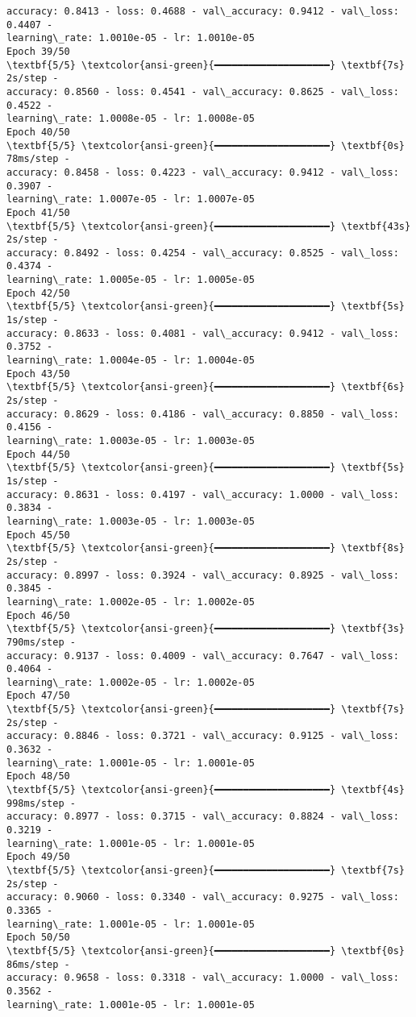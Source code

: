 \documentclass[11pt]{article}
\begin{document}
\begin{Verbatim}[commandchars=\\\{\}]
accuracy: 0.8413 - loss: 0.4688 - val\_accuracy: 0.9412 - val\_loss: 0.4407 -
learning\_rate: 1.0010e-05 - lr: 1.0010e-05
Epoch 39/50
\textbf{5/5} \textcolor{ansi-green}{━━━━━━━━━━━━━━━━━━━━} \textbf{7s} 2s/step -
accuracy: 0.8560 - loss: 0.4541 - val\_accuracy: 0.8625 - val\_loss: 0.4522 -
learning\_rate: 1.0008e-05 - lr: 1.0008e-05
Epoch 40/50
\textbf{5/5} \textcolor{ansi-green}{━━━━━━━━━━━━━━━━━━━━} \textbf{0s} 78ms/step -
accuracy: 0.8458 - loss: 0.4223 - val\_accuracy: 0.9412 - val\_loss: 0.3907 -
learning\_rate: 1.0007e-05 - lr: 1.0007e-05
Epoch 41/50
\textbf{5/5} \textcolor{ansi-green}{━━━━━━━━━━━━━━━━━━━━} \textbf{43s} 2s/step -
accuracy: 0.8492 - loss: 0.4254 - val\_accuracy: 0.8525 - val\_loss: 0.4374 -
learning\_rate: 1.0005e-05 - lr: 1.0005e-05
Epoch 42/50
\textbf{5/5} \textcolor{ansi-green}{━━━━━━━━━━━━━━━━━━━━} \textbf{5s} 1s/step -
accuracy: 0.8633 - loss: 0.4081 - val\_accuracy: 0.9412 - val\_loss: 0.3752 -
learning\_rate: 1.0004e-05 - lr: 1.0004e-05
Epoch 43/50
\textbf{5/5} \textcolor{ansi-green}{━━━━━━━━━━━━━━━━━━━━} \textbf{6s} 2s/step -
accuracy: 0.8629 - loss: 0.4186 - val\_accuracy: 0.8850 - val\_loss: 0.4156 -
learning\_rate: 1.0003e-05 - lr: 1.0003e-05
Epoch 44/50
\textbf{5/5} \textcolor{ansi-green}{━━━━━━━━━━━━━━━━━━━━} \textbf{5s} 1s/step -
accuracy: 0.8631 - loss: 0.4197 - val\_accuracy: 1.0000 - val\_loss: 0.3834 -
learning\_rate: 1.0003e-05 - lr: 1.0003e-05
Epoch 45/50
\textbf{5/5} \textcolor{ansi-green}{━━━━━━━━━━━━━━━━━━━━} \textbf{8s} 2s/step -
accuracy: 0.8997 - loss: 0.3924 - val\_accuracy: 0.8925 - val\_loss: 0.3845 -
learning\_rate: 1.0002e-05 - lr: 1.0002e-05
Epoch 46/50
\textbf{5/5} \textcolor{ansi-green}{━━━━━━━━━━━━━━━━━━━━} \textbf{3s} 790ms/step -
accuracy: 0.9137 - loss: 0.4009 - val\_accuracy: 0.7647 - val\_loss: 0.4064 -
learning\_rate: 1.0002e-05 - lr: 1.0002e-05
Epoch 47/50
\textbf{5/5} \textcolor{ansi-green}{━━━━━━━━━━━━━━━━━━━━} \textbf{7s} 2s/step -
accuracy: 0.8846 - loss: 0.3721 - val\_accuracy: 0.9125 - val\_loss: 0.3632 -
learning\_rate: 1.0001e-05 - lr: 1.0001e-05
Epoch 48/50
\textbf{5/5} \textcolor{ansi-green}{━━━━━━━━━━━━━━━━━━━━} \textbf{4s} 998ms/step -
accuracy: 0.8977 - loss: 0.3715 - val\_accuracy: 0.8824 - val\_loss: 0.3219 -
learning\_rate: 1.0001e-05 - lr: 1.0001e-05
Epoch 49/50
\textbf{5/5} \textcolor{ansi-green}{━━━━━━━━━━━━━━━━━━━━} \textbf{7s} 2s/step -
accuracy: 0.9060 - loss: 0.3340 - val\_accuracy: 0.9275 - val\_loss: 0.3365 -
learning\_rate: 1.0001e-05 - lr: 1.0001e-05
Epoch 50/50
\textbf{5/5} \textcolor{ansi-green}{━━━━━━━━━━━━━━━━━━━━} \textbf{0s} 86ms/step -
accuracy: 0.9658 - loss: 0.3318 - val\_accuracy: 1.0000 - val\_loss: 0.3562 -
learning\_rate: 1.0001e-05 - lr: 1.0001e-05
    \end{Verbatim}
\end{document}
